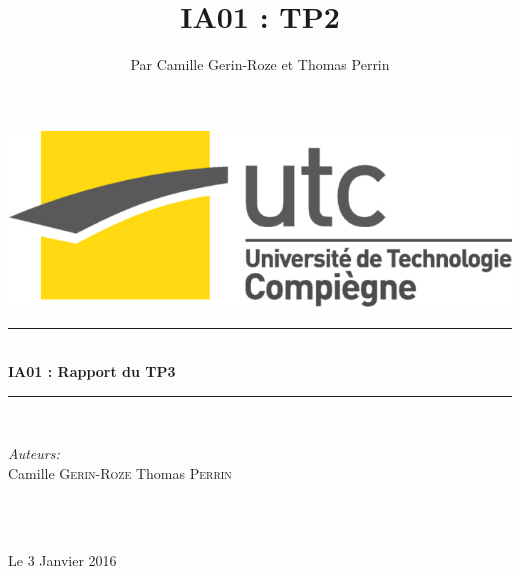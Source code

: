 \documentclass[a4paper,10pt]{report}
\title{IA01 : TP2}
\author{Par Camille Gerin-Roze et Thomas Perrin}
\begin{document}
\begin{titlepage}

\begin{flushright}
  \includegraphics[scale = 0.2]{logo_utc.jpg}
\end{flushright}
\vspace*{5cm}

\newcommand{\HRule}{\rule{\linewidth}{0.5mm}} %
\center %
 



\HRule \\[0.4cm]
{ \LARGE \bfseries  IA01 : Rapport du TP3}\\[0.4cm] %
\HRule \\[1.5cm]
 
\begin{minipage}{0.4\textwidth}
\begin{flushleft} \large
\emph{Auteurs:}\\
Camille \textsc{Gerin-Roze} \newline
Thomas \textsc{Perrin} 
\end{flushleft}
\end{minipage}
~
\begin{minipage}{0.4\textwidth}

\end{minipage}\\[1.3cm]


{\large Le 3 Janvier 2016} %

\end{titlepage}
\tableofcontents
\end{document}
